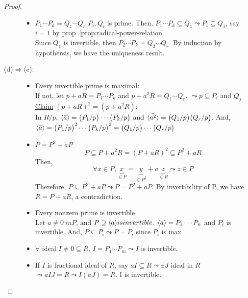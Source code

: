 \begin{theorem}
\begin{proof}
\begin{description}
\begin{itemize}
          \item $P_1\cdots P_k = Q_1\cdots Q_r$ $P_i, Q_i$ is prime. Then, $P_1\cdots
             P_k \subseteq Q_1 \leadsto P_i \subseteq Q_1$, say $i = 1$ by 
             prop~\ref{prop:radical-power-relation}. \\
             Since $Q_1$ is invertible, then $P_2\cdots P_k = Q_2\cdots Q_r$. By 
             induction by hypothersis, we have the uniqueness result.
        \end{itemize}
      \item[\rm (d)$\Rightarrow$(c):]
        \begin{itemize}
          \item Every invertible prime is maximal: \\
            If not, let $p + aR = P_1 \cdots P_k$ and $p + a^2R = Q_1 \cdots Q_r$. 
            $\leadsto p \subseteq P_i$ and $Q_j$\\
            \underline{Claim} $(p + aR)^2 = (p + a^2R)$: \\
            In $R/p$, $\langle\bar{a}\rangle = \big(P_1/p\big) \cdots \big(P_k/p\big)$ and 
            $\langle\bar{a^2}\rangle= \big(Q_1/p\big)\big(Q_r/p\big)$. And, $\langle\bar{a}\rangle
             = \big(P_1/p\big)^2 \cdots \big(P_k/p\big)^2 = \big(Q_1/p\big) \cdots
             \big(Q_r/p\big)$
          \item $P = P^2 + aP$
             $$
             P \subseteq P + a^2R = (P + aR)^2 \subseteq P^2 + aR
             $$
             Then,
             $$
             \forall x \in P, \underbrace{x}_{\in P} = \underbrace{y}_{\in P^2}
             + a\underbrace{z}_{\in R} \leadsto z \in P
             $$
             Therefore, $P\subseteq P^2 + aP \leadsto P = P^2 + aP$. 
        By invertibility of P, we have $R = P + aR$, a contradiction.
        \item Every nonzero prime is invertible \\
          Let $a \neq 0 \ in P$, and $P \supseteq \langle a\rangle is invertible$. $\langle a\rangle
            = P_1 \cdots P_n$ and $P_i$ is invertible. And, $P \subseteq P_i 
            \leadsto P = P_i$ since $P_i$ is max.
        \item $\forall$ ideal $I \neq 0 \subseteq R$, $I = P_1 \cdots P_m \leadsto 
          I$ is invertible.
        \item If $I$ is fractional ideal of $R$, say $aI \subseteq R \leadsto 
          \exists J$ ideal in $R$ $\leadsto aIJ = R \leadsto I(aJ) = R$. I is
            invertible.
        \end{itemize}
  \end{description}
  \end{proof}
\end{theorem}
